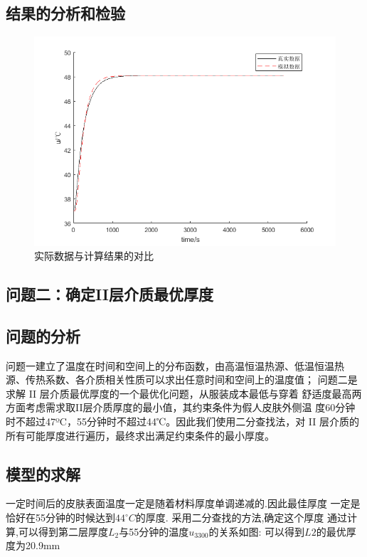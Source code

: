 \documentclass{cumcmthesis}
\begin{document}
        \subsection{结果的分析和检验} 

        \begin{figure}[htb] 
        \centering 
        \includegraphics[scale=0.9]{../figure/ques1result.png} 
        \caption{实际数据与计算结果的对比}\label{fig:one}    
        \end{figure}


    \subsection{问题二：确定II层介质最优厚度} 
        \subsection{问题的分析} 
        问题一建立了温度在时间和空间上的分布函数，由高温恒温热源、低温恒温热
    源、传热系数、各介质相关性质可以求出任意时间和空间上的温度值；
        问题二是求解 II 层介质最优厚度的一个最优化问题，从服装成本最低与穿着
    舒适度最高两方面考虑需求取II层介质厚度的最小值，其约束条件为假人皮肤外侧温
    度60分钟时不超过47ºC，55分钟时不超过44℃。因此我们使用二分查找法，对
     II 层介质的所有可能厚度进行遍历，最终求出满足约束条件的最小厚度。 
        \subsection{模型的求解}
        一定时间后的皮肤表面温度一定是随着材料厚度单调递减的.因此最佳厚度
        一定是恰好在55分钟的时候达到\(44^{\circ}C\)的厚度.
    采用二分查找的方法,确定这个厚度
    通过计算,可以得到第二层厚度\(L_2\)与55分钟的温度\(u_{3300}\)的关系如图:
    可以得到\(L2\)的最优厚度为20.9mm  
\end{document}
